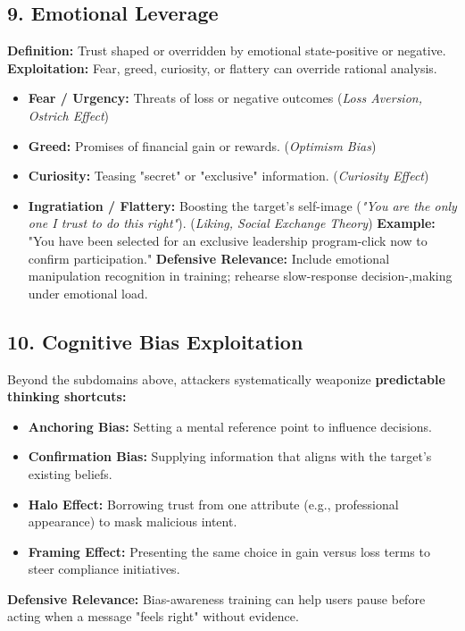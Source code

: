 {\subsection{9. Emotional Leverage}
\textbf{Definition:} Trust shaped or overridden by emotional state-positive or negative.
\textbf{Exploitation:} Fear, greed, curiosity, or flattery can override rational analysis.
\begin{itemize}
    \item \textbf{Fear / Urgency:} Threats of loss or negative outcomes (\textit{Loss Aversion, Ostrich Effect})
    \item \textbf{Greed:} Promises of financial gain or rewards. (\textit{Optimism Bias})
    \item \textbf{Curiosity:} Teasing "secret" or "exclusive" information. (\textit{Curiosity Effect})
    \item \textbf{Ingratiation / Flattery:} Boosting the target's self-image (\textit{"You are the only one I trust to do this right"}). (\textit{Liking, Social Exchange Theory})
\textbf{Example: }"You have been selected for an exclusive leadership program-click now to confirm participation."
\textbf{Defensive Relevance:} Include emotional manipulation recognition in training; rehearse slow-response decision-,making under emotional load.
\end{itemize}

\subsection{10. Cognitive Bias Exploitation}
Beyond the subdomains above, attackers systematically weaponize \textbf{predictable thinking shortcuts:}
\begin{itemize}
    \item \textbf{Anchoring Bias:} Setting a mental reference point to influence decisions.
    \item \textbf{Confirmation Bias:} Supplying information that aligns with the target's existing beliefs.
    \item \textbf{Halo Effect:} Borrowing trust from one attribute (e.g., professional appearance) to mask malicious intent.
    \item \textbf{Framing Effect:} Presenting the same choice in gain versus loss terms to steer compliance initiatives.
\end{itemize}
\textbf{Defensive Relevance:} Bias-awareness training can help users pause before acting when a message "feels right" without evidence.

}
